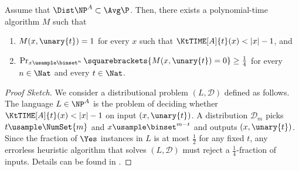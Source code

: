 \documentclass{toc}
\begin{document}
\begin{lemma}
  \label{fact_DistNPtoHSG}
  Assume that $\Dist\NP^A \subset \Avg\P$.
  Then,
  there exists a polynomial-time algorithm $M$ such that
  \begin{enumerate}
    \item
          $M(x, \unary{t}) = 1$ for every $x$ such that $\KtTIME[A]{t}(x) < |x| - 1$, and
    \item
          $\Pr_{x \usample \binset^n} \squarebrackets{ M(x, \unary{t}) = 0} \ge \frac{1}{4}$
          for every $n \in \Nat$ and every $t \in \Nat$.
  \end{enumerate}
\end{lemma}
\begin{proof}
  [Proof Sketch]
  We consider a distributional problem $(L, \mathcal{D})$ defined as follows.
  The language $L \in \NP^A$ is the problem of deciding whether $\KtTIME[A]{t}(x) < |x| - 1$
  on input $(x, \unary{t})$.
  A distribution $\mathcal{D}_m$ picks $t \usample \NumSet{m}$ and $x \usample \binset^{m - t}$
  and outputs $(x, \unary{t})$.
  Since
  the fraction of $\Yes$ instances in $L$ is at most $\frac{1}{2}$ for any fixed $t$,
  any errorless heuristic algorithm that solves $(L, \mathcal{D})$
  must reject a $\frac{1}{4}$-fraction of inputs.
  Details can be found in \cite{Hirahara18_focs_conf}.
\end{proof}
\end{document}
